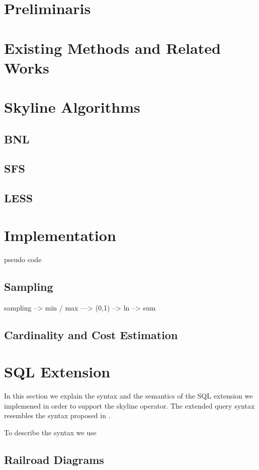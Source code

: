\section{Preliminaris}
\section{Existing Methods and Related Works}
\section{Skyline Algorithms}
\subsection{BNL}
\subsection{SFS}
\subsection{LESS}

\section{Implementation}
pseudo code

\subsection{Sampling}

sampling --> min / max  ---> (0,1) --> ln   --> sum

\subsection{Cardinality and Cost Estimation}


\section{SQL Extension}

In this section we explain the syntax and the semantics of the SQL
extension we implemened in order to support the skyline operator. The
extended query syntax resembles the syntax proposed in
\citep{Borzsonyi2001}.

To describe the syntax we use 
\subsection{Railroad Diagrams}

